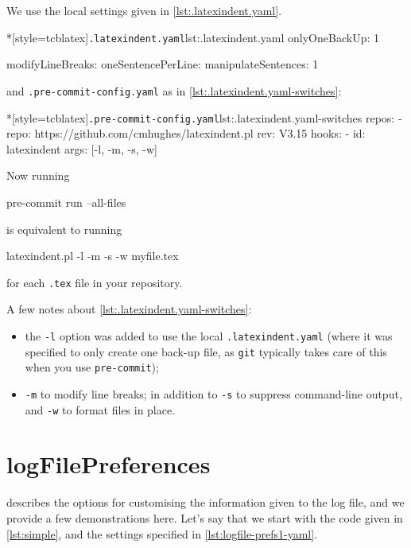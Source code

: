 		\begin{example}
			We use the local settings given in \cref{lst:.latexindent.yaml}.
			\begin{cmhlistings}*[style=tcblatex]{\texttt{.latexindent.yaml}}{lst:.latexindent.yaml}
onlyOneBackUp: 1

modifyLineBreaks:
 oneSentencePerLine:
   manipulateSentences: 1
\end{cmhlistings}

			and \texttt{.pre-commit-config.yaml} as in \cref{lst:.latexindent.yaml-switches}:
			\begin{cmhlistings}*[style=tcblatex]{\texttt{.pre-commit-config.yaml}}{lst:.latexindent.yaml-switches}
repos:
- repo: https://github.com/cmhughes/latexindent.pl
  rev: V3.15
  hooks:
  - id: latexindent
    args: [-l, -m, -s, -w]
\end{cmhlistings}
			Now running
			\begin{commandshell}
pre-commit run --all-files  
\end{commandshell}
			is equivalent to running
			\begin{commandshell}
latexindent.pl -l -m -s -w myfile.tex
\end{commandshell}
			for each \texttt{.tex} file in your repository.

			A few notes about \cref{lst:.latexindent.yaml-switches}:
			\begin{itemize}
				\item the \texttt{-l} option was added to use the local \texttt{.latexindent.yaml} (where it
				      was specified to only create one back-up file, as \texttt{git} typically takes care of
				      this when you use \texttt{pre-commit});
				\item \texttt{-m} to modify line breaks; in addition to \texttt{-s} to suppress command-line
				      output,
				      and \texttt{-w} to format files in place.
			\end{itemize}
		\end{example}

	\section{logFilePreferences}\label{app:logfile-demo}
	  describes the options for customising the information given
	 to the log file, and we provide a few demonstrations here. Let's say that we start with
	 the code given in \cref{lst:simple}, and the settings specified in
	 \cref{lst:logfile-prefs1-yaml}.


